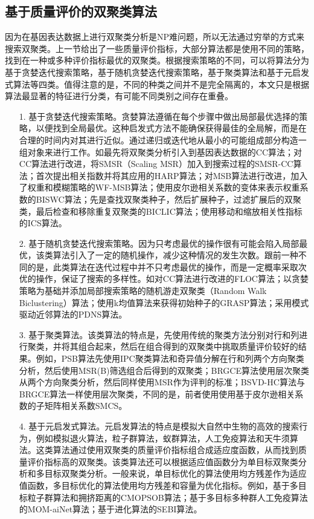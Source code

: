   \subsection{基于质量评价的双聚类算法}
  因为在基因表达数据上进行双聚类分析是NP难问题，所以无法通过穷举的方式来搜索双聚类。上一节给出了一些质量评价指标，大部分算法都是使用不同的策略，找到在一种或多种评价指标最优的双聚类。根据搜索策略的不同，可以将算法分为基于贪婪迭代搜索策略，基于随机贪婪迭代搜索策略，基于聚类算法和基于元启发式算法等四类。值得注意的是，不同的种类之间并不是完全隔离的，本文只是根据算法最显著的特征进行分类，有可能不同类别之间存在重叠。
  \begin{enumerate}
    \item[1.] 基于贪婪迭代搜索策略。贪婪算法遵循在每个步骤中做出局部最优选择的策略，以便找到全局最优。这种启发式方法不能确保获得最佳的全局解，而是在合理的时间内对其进行近似。通过递归或迭代地从最小的可能组成部分构造一组对象来进行工作。如最先将双聚类分析引入到基因表达数据的CC算法；对CC算法进行改进，将SMSR（Scaling MSR）加入到搜索过程的SMSR-CC\cite{smsr-cc}算法；首次提出相关指数并将其应用的HARP算法；对MSB算法进行改进，加入了权重和模糊策略的WF-MSB\cite{wf-msb}算法；使用皮尔逊相关系数的变体来表示权重系数的BISWC\cite{biswc}算法；先是查找双聚类种子，然后扩展种子，过滤扩展后的双聚类，最后检查和移除重复双聚类的BICLIC算法；使用移动和缩放相关性指标的ICS算法。

    \item[2.] 基于随机贪婪迭代搜索策略。因为只考虑最优的操作很有可能会陷入局部最优，该类算法引入了一定的随机操作，减少这种情况的发生次数。跟前一种不同的是，此类算法在迭代过程中并不只考虑最优的操作，而是一定概率采取次优的操作，保证了搜索的多样性。如对CC算法进行改进的FLOC算法；以贪婪策略为基础并添加局部搜索策略的随机游走双聚类（Random Walk Biclustering）算法\cite{rwb}；使用k均值算法来获得初始种子的GRASP算法\cite{grasp}；采用模式驱动近邻算法的PDNS算法\cite{pdns}。
    
    \item[3.] 基于聚类算法。该类算法的特点是，先使用传统的聚类方法分别对行和列进行聚类，并将其组合起来，然后在组合得到的双聚类中挑取质量评价较好的结果。例如，PSB算法先使用IPC聚类算法和奇异值分解在行和列两个方向聚类分析，然后使用MSR(B)筛选组合后得到的双聚类；BRGCE算法使用层次聚类从两个方向聚类分析，然后同样使用MSR作为评判的标准；BSVD-HC算法与BRGCE算法一样使用层次聚类，不同的是，前者使用使用基于皮尔逊相关系数的子矩阵相关系数SMCS。
    
    \item[4.] 基于元启发式算法。元启发算法的特点是模拟大自然中生物的高效的搜索行为，例如模拟退火算法，粒子群算法，蚁群算法，人工免疫算法和天牛须算法。这类算法通过使用双聚类的质量评价指标组合成适应度函数，从而找到质量评价指标高的双聚类。该类算法还可以根据适应值函数分为单目标双聚类分析和多目标双聚类分析。一般来说，单目标优化的算法使用均方残差作为适应值函数，多目标优化的算法使用均方残差和容量为优化指标。例如，基于多目标粒子群算法和拥挤距离的CMOPSOB算法\cite{cmopsob}；基于多目标多种群人工免疫算法的MOM-aiNet算法；基于进化算法的SEBI算法\cite{sebi}。
  \end{enumerate}

